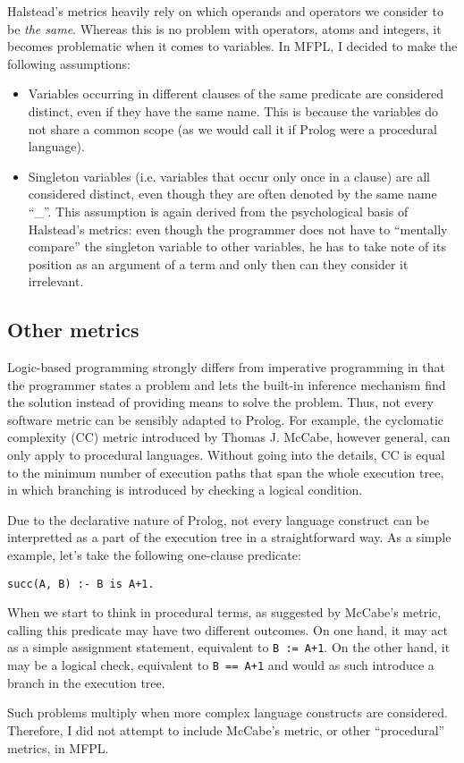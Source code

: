\documentclass[11pt,a4paper,twoside]{article}
\begin{document}
\begin{multicols}{2}
Halstead's metrics heavily rely on which operands and operators we
consider to be \emph{the same}. Whereas this is no problem with
operators, atoms and integers, it becomes problematic when it comes to
variables. In MFPL, I decided to make the following assumptions:
\begin{itemize}
\item Variables occurring in different clauses of the same predicate
  are considered distinct, even if they have the same name. This is
  because the variables do not share a common scope (as we would call
  it if Prolog were a procedural language). 
\item Singleton variables (i.e. variables that occur only once in a
  clause) are all considered distinct, even though they are often
  denoted by the same name ``\_''. This assumption is again derived
  from the psychological basis of Halstead's metrics: even though the
  programmer does not have to ``mentally compare'' the singleton
  variable to other variables, he has to take note of its position as
  an argument of a term and only then can they consider it irrelevant.
\end{itemize}

\subsection{Other metrics}

Logic-based programming strongly differs from imperative programming
in that the programmer states a problem and lets the built-in
inference mechanism find the solution instead of providing means to
solve the problem. Thus, not every software metric can be sensibly
adapted to Prolog. For example, the cyclomatic complexity (CC) metric
introduced by Thomas J. McCabe\cite{mccabe}, however general, can only
apply to procedural languages. Without going into the details, CC is
equal to the minimum number of execution paths that span the whole
execution tree, in which branching is introduced by checking a logical
condition. 

Due to the declarative nature of Prolog, not every language construct
can be interpretted as a part of the execution tree in a
straightforward way. As a simple example, let's take the following
one-clause predicate:
\begin{center}
\texttt{succ(A, B) :- B is A+1.}
\end{center}
When we start to think in procedural terms, as suggested by McCabe's
metric, calling this predicate may have two different outcomes. On one
hand, it may act as a simple assignment statement, equivalent to
\texttt{B~:=~A+1}. On the other hand, it may be a logical check,
equivalent to \texttt{B~==~A+1} and would as such introduce a branch
in the execution tree. 

Such problems multiply when more complex language constructs are
considered. Therefore, I did not attempt to include McCabe's metric,
or other ``procedural'' metrics, in MFPL.

\end{multicols}
\end{document}
